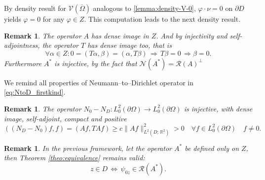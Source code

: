 \documentclass[10pt, a4paper, twoside, openright]{book}
\theoremstyle{definition}
\theoremstyle{plain}
\theoremstyle{plain}
\theoremstyle{plain}
\theoremstyle{plain}
\newtheorem{remark}[subsection]{Remark}
\theoremstyle{plain}
\theoremstyle{plain}
\theoremstyle{plain}
\theoremstyle{plain}
\let\phi\varphi
\begin{document}
By density result for $\mathcal{V}(\overline{\Omega})$ analogous to \ref{lemma:density-V-0}, $\phi\cdot \nu=0$ on $\partial D$ yields $\phi=0$ for any $\phi\in Z$.
This computation leads to the next density result.
\begin{remark}
 The operator $A$ has dense image in $Z$. And by injectivity and self-adjointness, the operator $T$ has dense image too, that is
 \begin{equation}
  \forall\alpha\in Z: 0=(T\alpha,\beta)=(\alpha,T\beta)\,\Rightarrow \, T\beta = 0 \, \Rightarrow \beta=0.
 \end{equation}
 Furthermore $A^*$ is injective, by the fact that $\mathcal{N}(A^*)=\mathcal{R}(A)^\perp$
\end{remark}
We remind all properties of Neumann--to--Dirichlet operator in \eqref{eq:NtoD_firstkind}.
\begin{remark}
 The operator ${N_0} - {N_D}: L^2_0(\partial \Omega) \to L^2_0(\partial \Omega)$ is injective, with dense image, self-adjoint, compact and positive
 \begin{equation}
  (({N_D} - {N_0})f,f) = ( Af,TAf) \geq c\|Af\|^2_{L^2(D;\,\mathbb{R}^2)} > 0 \quad \forall f\in L^2_0(\partial \Omega) \quad f\neq0.
 \end{equation} 
\end{remark}
\begin{remark}
 In the previous framework, let the operator $A^*$ be defined only on $Z$, then Theorem \ref{theo:equivalence} remains valid:
  \begin{equation}
  z \in D \,\Longleftrightarrow \,\psi_{0z} \in \mathcal{R}(A^*).
 \end{equation}
\end{remark}
\end{document}
